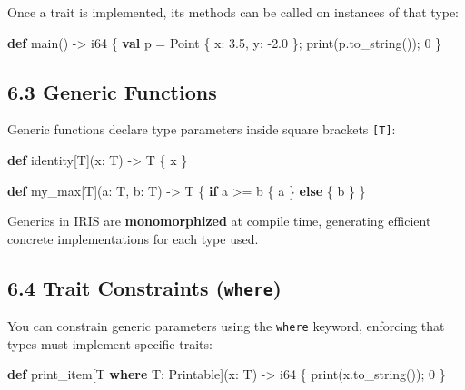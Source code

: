\documentclass[
  english,
]{book}
\newenvironment{Shaded}{\begin{snugshade}}{\end{snugshade}}
\newcommand{\ControlFlowTok}[1]{\textcolor[rgb]{0.77,0.53,0.75}{\textbf{#1}}}
\newcommand{\DataTypeTok}[1]{\textcolor[rgb]{0.31,0.79,0.69}{#1}}
\newcommand{\DecValTok}[1]{\textcolor[rgb]{0.71,0.81,0.66}{#1}}
\newcommand{\FloatTok}[1]{\textcolor[rgb]{0.71,0.81,0.66}{#1}}
\newcommand{\FunctionTok}[1]{\textcolor[rgb]{0.86,0.86,0.67}{#1}}
\newcommand{\KeywordTok}[1]{\textcolor[rgb]{0.34,0.61,0.84}{\textbf{#1}}}
\newcommand{\NormalTok}[1]{\textcolor[rgb]{0.83,0.83,0.83}{#1}}
\newcommand{\OperatorTok}[1]{\textcolor[rgb]{0.83,0.83,0.83}{#1}}
\begin{document}
Once a trait is implemented, its methods can be called on instances of
that type:

\begin{Shaded}
\begin{Highlighting}[]
\KeywordTok{def}\NormalTok{ main() }\OperatorTok{{-}\textgreater{}} \DataTypeTok{i64}\NormalTok{ \{}
    \KeywordTok{val}\NormalTok{ p }\OperatorTok{=}\NormalTok{ Point \{ x: }\FloatTok{3.5}\NormalTok{, y: }\OperatorTok{{-}}\FloatTok{2.0}\NormalTok{ \};}
    \FunctionTok{print}\NormalTok{(p}\OperatorTok{.}\NormalTok{to\_string());}
    \DecValTok{0}
\NormalTok{\}}
\end{Highlighting}
\end{Shaded}

\subsection{6.3 Generic Functions}\label{generic-functions}

Generic functions declare type parameters inside square brackets
\texttt{{[}T{]}}:

\begin{Shaded}
\begin{Highlighting}[]
\KeywordTok{def}\NormalTok{ identity[T](x: T) }\OperatorTok{{-}\textgreater{}}\NormalTok{ T \{}
\NormalTok{    x}
\NormalTok{\}}

\KeywordTok{def}\NormalTok{ my\_max[T](a: T, b: T) }\OperatorTok{{-}\textgreater{}}\NormalTok{ T \{}
    \ControlFlowTok{if}\NormalTok{ a }\OperatorTok{\textgreater{}=}\NormalTok{ b \{ a \} }\ControlFlowTok{else}\NormalTok{ \{ b \}}
\NormalTok{\}}
\end{Highlighting}
\end{Shaded}

Generics in IRIS are \textbf{monomorphized} at compile time, generating
efficient concrete implementations for each type used.

\subsection{\texorpdfstring{6.4 Trait Constraints
(\texttt{where})}{6.4 Trait Constraints (where)}}\label{trait-constraints-where}

You can constrain generic parameters using the \texttt{where} keyword,
enforcing that types must implement specific traits:

\begin{Shaded}
\begin{Highlighting}[]
\KeywordTok{def}\NormalTok{ print\_item[T }\KeywordTok{where}\NormalTok{ T: Printable](x: T) }\OperatorTok{{-}\textgreater{}} \DataTypeTok{i64}\NormalTok{ \{}
    \FunctionTok{print}\NormalTok{(x}\OperatorTok{.}\NormalTok{to\_string());}
    \DecValTok{0}
\NormalTok{\}}
\end{Highlighting}
\end{Shaded}
\end{document}
